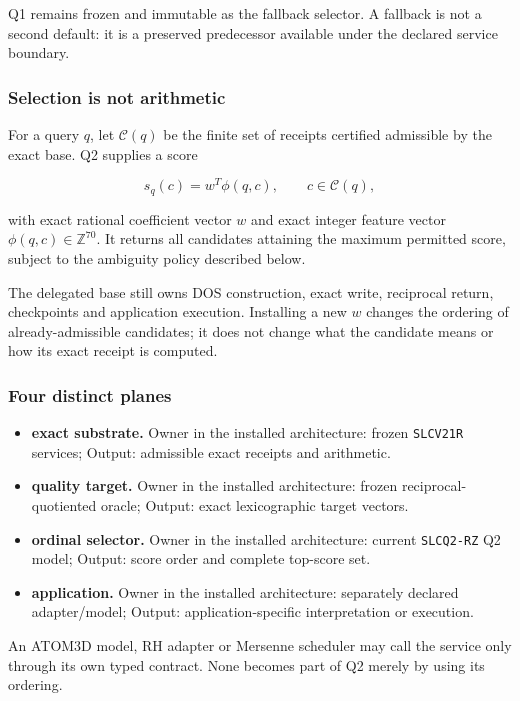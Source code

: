 Q1 remains frozen and immutable as the fallback selector. A fallback is
not a second default: it is a preserved predecessor available under the
declared service boundary.

\subsubsection{Selection is not
arithmetic}\label{viii-ch07-selection-is-not-arithmetic}

For a query \(q\), let \(\mathcal C(q)\) be the finite set of receipts
certified admissible by the exact base. Q2 supplies a score

\[
s_q(c)=w^T\phi(q,c),\qquad c\in\mathcal C(q),
\]

with exact rational coefficient vector \(w\) and exact integer feature
vector \(\phi(q,c)\in\mathbb Z^{70}\). It returns all candidates
attaining the maximum permitted score, subject to the ambiguity policy
described below.

The delegated base still owns DOS construction, exact write, reciprocal
return, checkpoints and application execution. Installing a new \(w\)
changes the ordering of already-admissible candidates; it does not
change what the candidate means or how its exact receipt is computed.

\subsubsection{Four distinct planes}\label{viii-ch07-four-distinct-planes}

\begin{itemize}
\tightlist
\item
  \textbf{exact substrate.} Owner in the installed architecture: frozen
  \texttt{SLCV21R} services; Output: admissible exact receipts and
  arithmetic.
\item
  \textbf{quality target.} Owner in the installed architecture: frozen
  reciprocal-quotiented oracle; Output: exact lexicographic target
  vectors.
\item
  \textbf{ordinal selector.} Owner in the installed architecture:
  current \texttt{SLCQ2-RZ} Q2 model; Output: score order and complete
  top-score set.
\item
  \textbf{application.} Owner in the installed architecture: separately
  declared adapter/model; Output: application-specific interpretation or
  execution.
\end{itemize}

An ATOM3D model, RH adapter or Mersenne scheduler may call the service
only through its own typed contract. None becomes part of Q2 merely by
using its ordering.

